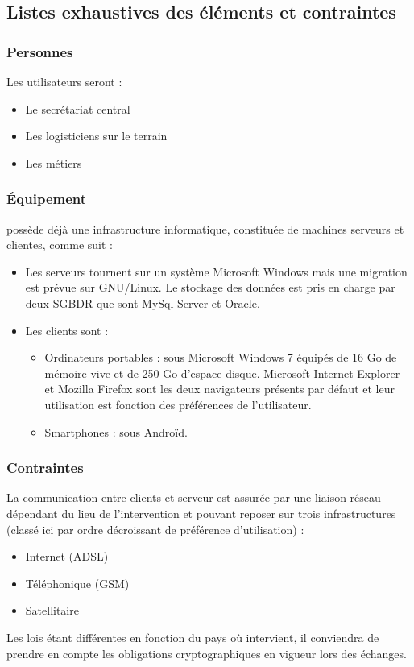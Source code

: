 \subsection{Listes exhaustives des éléments et contraintes}

\subsubsection{Personnes}
Les utilisateurs seront :
\begin{itemize}
\item Le secrétariat central
\item Les logisticiens sur le terrain
\item Les métiers
\end{itemize}

\subsubsection{Équipement}
\mo possède déjà une infrastructure informatique, constituée de machines serveurs et clientes, comme suit :
\begin{itemize}
\item Les serveurs tournent sur un système Microsoft Windows mais une migration est prévue sur GNU/Linux. Le stockage des données est pris en charge par deux SGBDR que sont MySql Server et Oracle.
\item Les clients sont :
\begin{itemize}
\item Ordinateurs portables : sous Microsoft Windows 7 équipés de 16 Go de mémoire vive et de 250 Go d'espace disque. Microsoft Internet Explorer et Mozilla Firefox sont les deux navigateurs présents par défaut et leur utilisation est fonction des préférences de l'utilisateur.
\item Smartphones : sous Androïd.
\end{itemize}
\end{itemize}

\subsubsection{Contraintes}
La communication entre clients et serveur est assurée par une liaison réseau dépendant du lieu de l'intervention et pouvant reposer sur trois infrastructures (classé ici par ordre décroissant de préférence d'utilisation) :
\begin{itemize}
\item Internet (ADSL)
\item Téléphonique (GSM)
\item Satellitaire
\end{itemize}
Les lois étant différentes en fonction du pays où \mo intervient, il conviendra de prendre en compte les obligations cryptographiques en vigueur lors des échanges.

